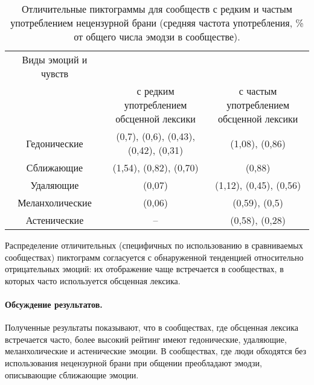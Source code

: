 \begin{table}[ht]%
	\centering
	\caption{Отличительные пиктограммы для сообществ с редким и частым употреблением нецензурной брани (средняя частота употребления, \% от общего числа эмодзи в сообществе).}%
	\label{tab:emojiEmotion}%
		\begin{tabular}{ c  c  c  }%
			\toprule
			Виды эмоций и чувств & \multicolumn{2}{c}{\makecell{Частота употребления эмодзи в группах}} \\
			\cline{2-3}
			& \makecell{с редким употреблением\\обсценной лексики} & \makecell{с частым употреблением\\обсценной лексики} \\
			\hline
			Гедонические & \makecell{\partyingface (0,7), \smilingface (0,6), \starstruck (0,43),\\\slightlysmilingface (0,42), \relievedface (0,31)} & \clownface (1,08), \catwithtearsofjoy (0,86) \\
			Сближающие & \smilingfacewithopenhands (1,54), \clappinghands (0,82), \faceblowingakiss (0,70) & \facesavoringfood (0,88) \\
			Удаляющие & \catwithwrysmile (0,07) & \smilingfacewithhorns (1,12), \facewithsteamfromnose (0,45), \facewithrollingeyes (0,56) \\
			Меланхолические & \sadbutrelievedface (0,06) & \nauseatedface (0,59), \wearyface (0,5) \\
			Астенические &  -- & \neutralface (0,58), \anxiousfacewithsweat (0,28) \\
			\bottomrule
		\end{tabular}%
\end{table}

Распределение отличительных (специфичных по использованию в сравниваемых сообществах) пиктограмм согласуется с обнаруженной тенденцией относительно отрицательных эмоций: их отображение чаще встречается в сообществах, в которых часто используется обсценная лексика.

\paragraph{Обсуждение результатов.} Полученные результаты показывают, что в сообществах, где обсценная лексика встречается часто, более высокий рейтинг имеют гедонические, удаляющие, меланхолические и астенические эмоции. В сообществах, где люди обходятся без использования нецензурной брани при общении преобладают эмодзи, описывающие сближающие эмоции.

